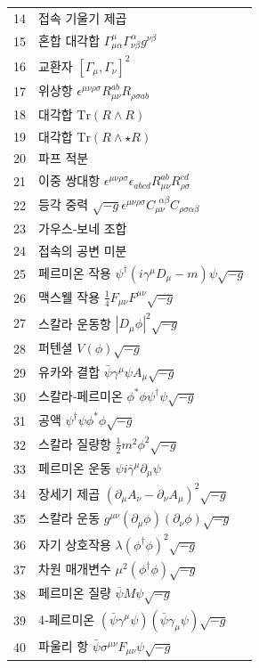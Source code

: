 \documentclass[11pt,a4paper]{article}
\begin{document}
\begin{longtable}{r l}
		14 & 접속 기울기 제곱 \\
		15 & 혼합 대각합 $\Gamma^{\mu}_{\mu\alpha}\Gamma^{\alpha}_{\nu\beta}g^{\nu\beta}$ \\
		16 & 교환자 $[\Gamma_\mu, \Gamma_\nu]^2$ \\
		17 & 위상항 $\epsilon^{\mu\nu\rho\sigma}R_{\mu\nu}^{ab}R_{\rho\sigma ab}$ \\
		18 & 대각합 $\mathrm{Tr}(R\wedge R)$ \\
		19 & 대각합 $\mathrm{Tr}(R\wedge\star R)$ \\
		20 & 파프 적분 \\
		21 & 이중 쌍대항 $\epsilon^{\mu\nu\rho\sigma}\epsilon_{abcd}R_{\mu\nu}^{ab}R_{\rho\sigma}^{cd}$ \\
		22 & 등각 중력 $\sqrt{-g}\epsilon^{\mu\nu\rho\sigma}C_{\mu\nu}^{\ \ \alpha\beta}C_{\rho\sigma\alpha\beta}$ \\
		23 & 가우스‑보네 조합 \\
		24 & 접속의 공변 미분 \\
		25 & 페르미온 작용 $\psi^\dagger(i\gamma^\mu D_\mu - m)\psi\sqrt{-g}$ \\
		26 & 맥스웰 작용 $\frac{1}{4}F_{\mu\nu}F^{\mu\nu}\sqrt{-g}$ \\
		27 & 스칼라 운동항 $|D_\mu\phi|^2\sqrt{-g}$ \\
		28 & 퍼텐셜 $V(\phi)\sqrt{-g}$ \\
		29 & 유카와 결합 $\bar{\psi}\gamma^\mu\psi A_\mu\sqrt{-g}$ \\
		30 & 스칼라‑페르미온 $\phi^*\phi\psi^\dagger\psi\sqrt{-g}$ \\
		31 & 공액 $\psi^\dagger\psi\phi^*\phi\sqrt{-g}$ \\
		32 & 스칼라 질량항 $\frac{1}{2}m^2\phi^2\sqrt{-g}$ \\
		33 & 페르미온 운동 $\psi i\bar{\gamma}^\mu\partial_\mu\psi$ \\
		34 & 장세기 제곱 $(\partial_\mu A_\nu - \partial_\nu A_\mu)^2\sqrt{-g}$ \\
		35 & 스칼라 운동 $g^{\mu\nu}(\partial_\mu\phi)(\partial_\nu\phi)\sqrt{-g}$ \\
		36 & 자기 상호작용 $\lambda(\phi^\dagger\phi)^2\sqrt{-g}$ \\
		37 & 차원 매개변수 $\mu^2(\phi^\dagger\phi)\sqrt{-g}$ \\
		38 & 페르미온 질량 $\bar{\psi}M\psi\sqrt{-g}$ \\
		39 & 4‑페르미온 $(\bar{\psi}\gamma^\mu\psi)(\bar{\psi}\gamma_\mu\psi)\sqrt{-g}$ \\
		40 & 파울리 항 $\bar{\psi}\sigma^{\mu\nu}F_{\mu\nu}\psi\sqrt{-g}$ \\

\end{longtable}
\end{document}
